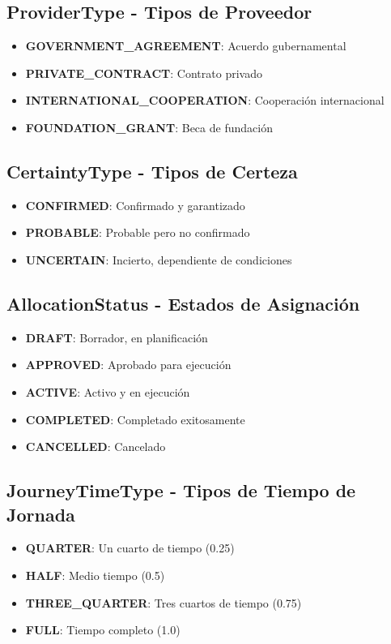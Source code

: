 \documentclass[11pt,a4paper]{article}
\begin{document}
\subsection{ProviderType - Tipos de Proveedor}
\begin{itemize}
    \item \textbf{GOVERNMENT\_AGREEMENT}: Acuerdo gubernamental
    \item \textbf{PRIVATE\_CONTRACT}: Contrato privado
    \item \textbf{INTERNATIONAL\_COOPERATION}: Cooperación internacional
    \item \textbf{FOUNDATION\_GRANT}: Beca de fundación
\end{itemize}

\subsection{CertaintyType - Tipos de Certeza}
\begin{itemize}
    \item \textbf{CONFIRMED}: Confirmado y garantizado
    \item \textbf{PROBABLE}: Probable pero no confirmado
    \item \textbf{UNCERTAIN}: Incierto, dependiente de condiciones
\end{itemize}

\subsection{AllocationStatus - Estados de Asignación}
\begin{itemize}
    \item \textbf{DRAFT}: Borrador, en planificación
    \item \textbf{APPROVED}: Aprobado para ejecución
    \item \textbf{ACTIVE}: Activo y en ejecución
    \item \textbf{COMPLETED}: Completado exitosamente
    \item \textbf{CANCELLED}: Cancelado
\end{itemize}

\subsection{JourneyTimeType - Tipos de Tiempo de Jornada}
\begin{itemize}
    \item \textbf{QUARTER}: Un cuarto de tiempo (0.25)
    \item \textbf{HALF}: Medio tiempo (0.5)
    \item \textbf{THREE\_QUARTER}: Tres cuartos de tiempo (0.75)
    \item \textbf{FULL}: Tiempo completo (1.0)
\end{itemize}
\end{document}
